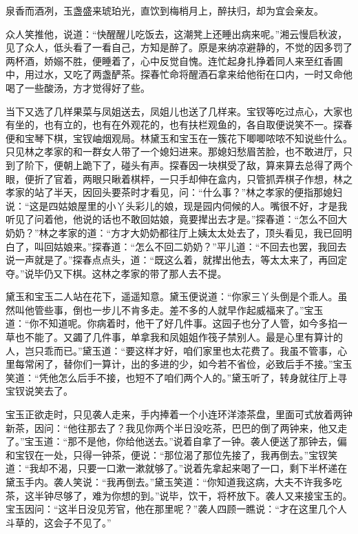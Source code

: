 泉香而酒冽，玉盏盛来琥珀光，直饮到梅梢月上，醉扶归，却为宜会亲友。

众人笑推他，说道：``快醒醒儿吃饭去，这潮凳上还睡出病来呢。''湘云慢启秋波，见了众人，低头看了一看自己，方知是醉了。原是来纳凉避静的，不觉的因多罚了两杯酒，娇嫋不胜，便睡着了，心中反觉自愧。连忙起身扎挣着同人来至红香圃中，用过水，又吃了两盏酽茶。探春忙命将醒酒石拿来给他衔在口内，一时又命他喝了一些酸汤，方才觉得好了些。

当下又选了几样果菜与凤姐送去，凤姐儿也送了几样来。宝钗等吃过点心，大家也有坐的，也有立的，也有在外观花的，也有扶栏观鱼的，各自取便说笑不一。探春便和宝琴下棋，宝钗岫烟观局。林黛玉和宝玉在一簇花下唧唧哝哝不知说些什么。只见林之孝家的和一群女人带了一个媳妇进来。那媳妇愁眉苦脸，也不敢进厅，只到了阶下，便朝上跪下了，碰头有声。探春因一块棋受了敌，算来算去总得了两个眼，便折了官着，两眼只瞅着棋枰，一只手却伸在盒内，只管抓弄棋子作想，林之孝家的站了半天，因回头要茶时才看见，问：``什么事？''林之孝家的便指那媳妇说：``这是四姑娘屋里的小丫头彩儿的娘，现是园内伺候的人。嘴很不好，才是我听见了问着他，他说的话也不敢回姑娘，竟要撵出去才是。''探春道：``怎么不回大奶奶？''林之孝家的道：``方才大奶奶都往厅上姨太太处去了，顶头看见，我已回明白了，叫回姑娘来。''探春道：``怎么不回二奶奶？''平儿道：``不回去也罢，我回去说一声就是了。''探春点点头，道：``既这么着，就撵出他去，等太太来了，再回定夺。''说毕仍又下棋。这林之孝家的带了那人去不提。

黛玉和宝玉二人站在花下，遥遥知意。黛玉便说道：``你家三丫头倒是个乖人。虽然叫他管些事，倒也一步儿不肯多走。差不多的人就早作起威福来了。''宝玉道：``你不知道呢。你病着时，他干了好几件事。这园子也分了人管，如今多掐一草也不能了。又蠲了几件事，单拿我和凤姐姐作筏子禁别人。最是心里有算计的人，岂只乖而已。''黛玉道：``要这样才好，咱们家里也太花费了。我虽不管事，心里每常闲了，替你们一算计，出的多进的少，如今若不省俭，必致后手不接。''宝玉笑道：``凭他怎么后手不接，也短不了咱们两个人的。''黛玉听了，转身就往厅上寻宝钗说笑去了。

宝玉正欲走时，只见袭人走来，手内捧着一个小连环洋漆茶盘，里面可式放着两钟新茶，因问：``他往那去了？我见你两个半日没吃茶，巴巴的倒了两钟来，他又走了。''宝玉道：``那不是他，你给他送去。''说着自拿了一钟。袭人便送了那钟去，偏和宝钗在一处，只得一钟茶，便说：``那位渴了那位先接了，我再倒去。''宝钗笑道：``我却不渴，只要一口漱一漱就够了。''说着先拿起来喝了一口，剩下半杯递在黛玉手内。袭人笑说：``我再倒去。''黛玉笑道：``你知道我这病，大夫不许我多吃茶，这半钟尽够了，难为你想的到。''说毕，饮干，将杯放下。袭人又来接宝玉的。宝玉因问：``这半日没见芳官，他在那里呢？''袭人四顾一瞧说：``才在这里几个人斗草的，这会子不见了。''

